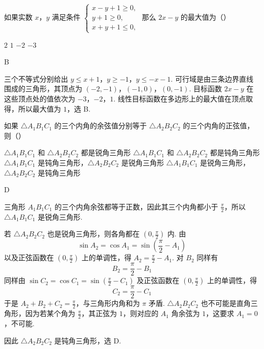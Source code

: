 \begin{problem}
如果实数 \(x\)，\(y\) 满足条件 \(\begin{cases}
x - y + 1 \geqslant 0,\\
y + 1 \geqslant 0,\\
x + y + 1 \leqslant 0,
\end{cases}\) 那么 \(2x - y\) 的最大值为（\quad）

\choices
    {\(2\)}
    {\(1\)}
    {\(-2\)}
    {\(-3\)}
\end{problem}

\begin{answer}
B
\end{answer}

\begin{solution}
三个不等式分别给出
\(y\leqslant x+1\)，\(y\geqslant-1\)，\(y\leqslant-x-1\).
可行域是由三条边界直线围成的三角形，其顶点为
\((-2,-1)\)，\((-1,0)\)，\((0,-1)\).
目标函数 \(2x-y\) 在这些顶点处的值依次为
\(-3\)，\(-2\)，\(1\).
线性目标函数在多边形上的最大值在顶点取得，所以最大值为 \(1\)，选 B.
\end{solution}

\begin{problem}
如果 \(\triangle A_{1}B_{1}C_{1}\) 的三个内角的余弦值分别等于 \(\triangle A_{2}B_{2}C_{2}\) 的三个内角的正弦值，则（\quad）

\choices
    {\(\triangle A_{1}B_{1}C_{1}\) 和 \(\triangle A_{2}B_{2}C_{2}\) 都是锐角三角形}
    {\(\triangle A_{1}B_{1}C_{1}\) 和 \(\triangle A_{2}B_{2}C_{2}\) 都是钝角三角形}
    {\(\triangle A_{1}B_{1}C_{1}\) 是钝角三角形，\(\triangle A_{2}B_{2}C_{2}\) 是锐角三角形}
    {\(\triangle A_{1}B_{1}C_{1}\) 是锐角三角形，\(\triangle A_{2}B_{2}C_{2}\) 是钝角三角形}
\end{problem}

\begin{answer}
D
\end{answer}

\begin{solution}
三角形 \(A_1B_1C_1\) 的三个内角余弦都等于正数，因此其三个内角都小于 \(\frac{\pi}{2}\)，所以 \(\triangle A_1B_1C_1\) 是锐角三角形.

若 \(\triangle A_2B_2C_2\) 也是锐角三角形，则各角都在 \((0,\frac{\pi}{2})\) 内. 由
\[
\sin A_{2}=\cos A_{1}=\sin\left(\frac{\pi}{2}-A_{1}\right)
\]
以及正弦函数在 \((0,\frac{\pi}{2})\) 上的单调性，得 \(A_2=\frac{\pi}{2}-A_1\). 对 \(B_2\) 同样有
\[
B_2=\frac{\pi}{2}-B_1
\]
同样由 \(\sin C_2=\cos C_1=\sin\left(\frac{\pi}{2}-C_1\right)\) 及正弦函数在 \((0,\frac{\pi}{2})\) 上的单调性，得
\[
C_2=\frac{\pi}{2}-C_1
\]
于是 \(A_2+B_2+C_2=\frac{\pi}{2}\)，与三角形内角和为 \(\pi\) 矛盾. \(\triangle A_2B_2C_2\) 也不可能是直角三角形，因为若某个角为 \(\frac{\pi}{2}\)，其正弦为 \(1\)，则对应的 \(A_1\) 角余弦为 \(1\)，这要求 \(A_1=0\)，不可能.

因此 \(\triangle A_2B_2C_2\) 是钝角三角形，选 D.
\end{solution}

